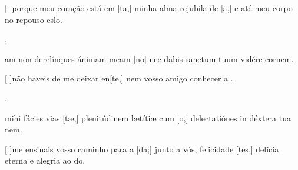 {    {\item {}[ ]{por}que meu coração está em [ta,] minha alma rejubila de [a,] e até meu corpo no repouso eslo.~\Antiphona},
  {\item {}am non derelínques ánimam meam [\-no] nec dabis sanctum tuum vidére cor\-nem.~\Antiphona}%
    {\item {}[ ]{não} haveis de me deixar en[te,] nem vosso amigo conhecer a .~\Antiphona},
  {\item {} mihi fácies vias [tæ,] plenitúdinem lætítiæ cum [o,] delectatiónes in déxtera tua nem.~\Antiphona}%
    {\item {}[ ]{me} ensinais vosso caminho para a [da;] junto a vós, felicidade [tes,] delícia eterna e alegria ao do.~\Antiphona}
}